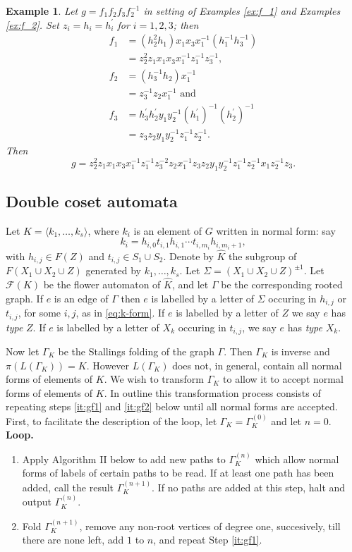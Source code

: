 \documentclass[a4paper,12pt]{article}
\newcommand{\G}{\Gamma }
\renewcommand{\S}{\Sigma }
\newcommand{\cF}{{\cal{F}}}
\newtheorem{exam}[theorem]{Example}
\newenvironment{example}{\begin{exam} \rm}{\end{exam}}
\numberwithin{equation}{section}
\numberwithin{figure}{section}
\renewcommand{\cF}{\mathcal{F}}
\newcommand{\la}{\langle}
\newcommand{\ra}{\rangle}
\newcommand{\be}{\begin{enumerate}}
\newcommand{\ee}{\end{enumerate}}
\begin{document}
\begin{example}\label{ex:g}
Let $g =f_1 f_2 f_3 f_2^{-1}$ in setting  of Examples \ref{ex:f_1} and 
Examples \ref{ex:f_2}.
Set $z_i = h_i = h_i^{\prime}$ for $i= 1,2,3$; then
\begin{align*}
f_1&=(h_2^{2}h_1) x_1x_3x_1^{-1} (h_1^{-1}h_3^{-1})\\
&=z_2^2z_1  x_1x_3x_1^{-1}z_1^{-1}z_3^{-1},\\
f_2&=(h_3^{-1}h_2) x_1^{-1}\\
&=z_3^{-1}z_2 x_1^{-1}\textrm{ and }\\
f_3&=h^\prime_3h_2^\prime y_1y_2^{-1} (h_1^\prime)^{-1}(h_2^\prime)^{-1}\\
&= z_3z_2 y_1y_2^{-1} z_1^{-1}z_2^{-1}.
\end{align*}
Then 
\[g=z_2^2 z_1  x_1 x_3 x_1^{-1} z_1^{-1} z_3^{-2}
z_2 x_1^{-1} 
z_3z_2 y_1y_2^{-1} z_1^{-1}z_2^{-1}
x_1z_2^{-1}z_3.
\]
\end{example}



\subsection{Double coset automata}
%
%
Let $K=\la k_1, \ldots , k_s\ra$, where $k_i$ is an element of $G$
written in normal form: say
\begin{equation}\label{eq:k-form}
k_i= h_{i,0}t_{i,1}h_{i,1}\cdots t_{i,m_i}h_{i,m_i+1},
\end{equation}
with $h_{i,j}\in F(Z)$ and $t_{i,j}\in S_1\cup S_2$. Denote
by $\hat K$ the subgroup of  $F(X_1\cup X_2 \cup Z)$ generated by
$k_1, \ldots , k_s$. Let $\S=(X_1\cup X_2 \cup Z)^{\pm 1}$. 
Let $\cF(K)$ be the flower automaton of $\hat K$, and let
$\G$ be the corresponding rooted graph. If $e$ is an edge of $\G$ then
$e$ is labelled by a letter of $\S$ 
occuring in $h_{i,j}$ or $t_{i,j}$, for some $i,j$, as in
\eqref{eq:k-form}. If $e$ is labelled by a letter of $Z$ we say $e$ has {\em type} $Z$.
If $e$ is labelled by a letter of $X_k$ occuring in
$t_{i,j}$, we say $e$ has {\em type} $X_k$.

Now let $\G_K$ be the Stallings folding of the graph $\G$.  Then
 $\G_K$ is inverse and $\pi(L(\G_K))=K$. However
$L(\G_K)$ does not, in general, contain all normal forms of elements of $K$.
We wish to transform $\G_K$ to allow it to accept normal forms of 
elements of $K$. In outline this transformation process consists 
of repeating steps \ref{it:gf1} and \ref{it:gf2} below until all normal forms
are accepted. First, to facilitate the description of the
loop, let $\G_K=\G_K^{(0)}$ and let $n=0$. \\[1em]
\textbf{Loop.}
\be[Step 1.]
\item\label{it:gf1} Apply Algorithm II below to add new paths to $\G_K^{(n)}$ which allow normal forms of labels
of certain paths to be read. If at least one path has been added, 
call the result $\G_{K}^{(n+1)}$.  If no paths are added at this step,
halt and output  $\G_K^{(n)}$. 
\item\label{it:gf2} Fold  $\G_{K}^{(n+1)}$, remove any non-root vertices
of degree one, succesively, till there are none left,  
add $1$ to $n$, and repeat Step \ref{it:gf1}.
\ee
\end{document}
